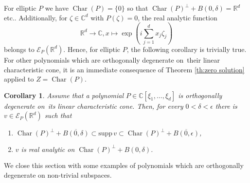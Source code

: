 \documentclass[a4paper,10pt]{amsart}
\newtheorem{corollary}[theorem]{Corollary}
\newtheorem*{crucial lemma}{Lemma \ref{lem:nice polynomial2}}
\theoremstyle{definition}
\newcommand{\R}{\mathbb{R}}
\newcommand{\C}{\mathbb{C}}
\newcommand{\supp}{\mbox{supp}\,}
\newcommand{\charcone}{\operatorname{Char}}
\newcommand{\veryniceon}[1]{orthogonally degenerate on~#1}
\begin{document}
For elliptic $P$ we have $\charcone(P)=\{0\}$ so that $\charcone(P)^\perp+B(0,\delta)=\R^d$ etc.. Additionally, for $\zeta\in\C^d$ with $P(\zeta)=0$, the real analytic function
\[\R^d\rightarrow\C, x\mapsto\exp\left(i\sum_{j=1}^dx_j\zeta_j\right)\]
belongs to $\mathscr{E}_P(\R^d)$. Hence, for elliptic $P$, the following corollary is trivially true. For other polynomials which are \veryniceon{their linear characteristic cone}, it is an immediate consequence of Theorem \ref{th:zero solution} applied to $Z=\charcone(P)$.
\begin{corollary}\label{cor:zero solution}
Assume that a polynomial $P\in\C[\xi_1,\ldots,\xi_d]$ is \veryniceon{its linear characteristic cone}. Then, for every $0<\delta<\epsilon$ there is $v\in\mathscr{E}_P(\R^d)$ such that
	\begin {enumerate}[{\upshape(i)}]
	\item $\charcone(P)^\perp+\overline{B(0,\delta)}\subset\supp v\subset \charcone(P)^\perp+\overline{B(0,\epsilon)}$,
	\item $v$ is real analytic on $\charcone(P)^\perp+B(0,\delta)$.
	\end{enumerate} 
\end{corollary}

We close this section with some examples of polynomials which are orthogonally degenerate on non-trivial subspaces. 
\end{document}
